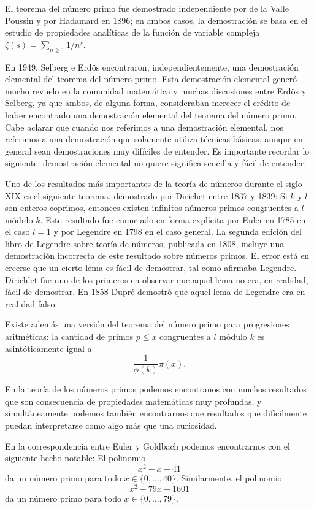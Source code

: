 El teorema del número primo fue demostrado independiente por de la Valle
Poussin y por Hadamard en 1896; en ambos casos, la demostración se basa en el
estudio de propiedades analíticas de la función de variable compleja
$\zeta(s)=\sum_{n\geq1}1/n^{s}$. 

En 1949, Selberg e Erd\"os encontraron,
independientemente, una demostración elemental del teorema del número primo.
Esta demostración elemental generó mucho revuelo en la comunidad matemática y
muchas discusiones entre Erd\"os y Selberg, ya que ambos, de alguna forma,
consideraban merecer el crédito de haber encontrado una demostración elemental
del teorema del número primo.  Cabe aclarar que cuando nos referimos a una
demostración elemental, nos referimos a una demostración que solamente utiliza
técnicas básicas, aunque en general sean demostraciones muy difíciles de
entender. Es importante recordar lo siguiente: demostración elemental no quiere
significa sencilla y fácil de entender. 

Uno de los resultados más importantes de la teoría de números durante el siglo
XIX es el siguiente teorema, demostrado por Dirichet entre 1837 y 1839: Si $k$
y $l$ son enteros coprimos, entonces existen infinitos números primos
congruentes a $l$ módulo $k$. 
Este resultado fue enunciado en forma explícita por Euler en 1785 en el caso
$l=1$ y por Legendre en 1798 en el caso general. La segunda edición del libro
de Legendre sobre teoría de números, publicada en 1808, incluye una
demostración incorrecta de este resultado sobre números primos. El error está
en creerse que un cierto lema es fácil de demostrar, tal como afirmaba
Legendre.  Dirichlet fue uno de los primeros en observar que aquel lema no era,
en realidad, fácil de demostrar. En 1858 Dupré demostró que aquel lema de
Legendre era en realidad falso.

Existe además una versión del teorema del número primo para progresiones
aritméticas: la cantidad de primos $p\leq x$ congruentes a $l$ módulo $k$ es
asintóticamente igual a 
\[
	\frac{1}{\phi(k)}\pi(x).
\]

En la teoría de los números primos podemos encontranos con muchos resultados
que son consecuencia de propiedades matemáticas muy profundas, y
simultáneamente podemos también encontrarnos que resultados que difícilmente
puedan interpretarse como algo más que una curiosidad.  

En la correspondencia
entre Euler y Goldbach podemos encontrarnos con el siguiente hecho notable: El
polinomio 
\[
	x^2-x+41
\]
da un número primo para todo $x\in\{0,\dots,40\}$. Similarmente, el polinomio
\[
	x^2-79x+1601
\]
da un número primo para todo $x\in\{0,\dots,79\}$. 

